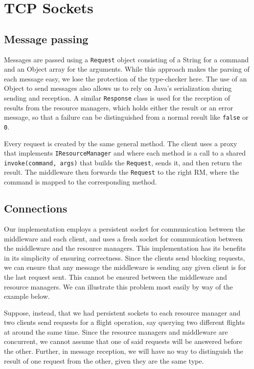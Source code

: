 \documentclass[10pt]{article}
\newcommand{\code}[1]{\lstinline{#1}}
\begin{document}
\section{TCP Sockets}\label{sec:tcp}

\subsection{Message passing}
Messages are passed using a \code{Request} object consisting of a String for a
command and an Object array for the arguments. While this approach makes the
parsing of each message easy, we lose the protection of the type-checker here.
The use of an Object to send messages also allows us to rely on Java's
serialization during sending and reception. A similar \code{Response} class is
used for the reception of results from the resource managers, which holds either
the result or an error message, so that a failure can be distinguished from a
normal result like \code{false} or \code{0}.

Every request is created by the same general method. The client uses a proxy
that implements \code{IResourceManager} and where each method is a call to a
shared \code{invoke(command, args)} that builds the \code{Request}, sends it,
and then return the result. The middleware then forwards the \code{Request}
to the right RM, where the command is mapped to the corresponding method.

\subsection{Connections}
Our implementation employs a persistent socket for communication between the
middleware and each client, and uses a fresh socket for communication between
the middleware and the resource managers. This implementation has its benefits
in its simplicity of ensuring correctness. Since the clients send blocking
requests, we can ensure that any message the middleware is sending any given
client is for the last request sent. This cannot be ensured between the
middleware and resource managers. We can illustrate this problem most easily by
way of the example below.

Suppose, instead, that we had persistent sockets to each resource manager and
two clients send requests for a flight operation, say querying two different
flights at around the same time. Since the resource managers and middleware are
concurrent, we cannot assume that one of said requests will be answered before
the other. Further, in message reception, we will have no way to distinguish the
result of one request from the other, given they are the same type.
\end{document}
